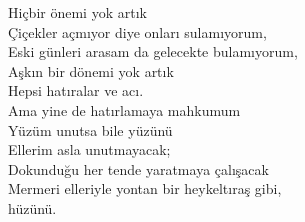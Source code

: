 \noindent\newline
Hiçbir önemi yok artık \\
Çiçekler açmıyor diye onları sulamıyorum, \\
Eski günleri arasam da gelecekte bulamıyorum, \\
Aşkın bir dönemi yok artık \\
Hepsi hatıralar ve acı. \\

\noindent\newline
Ama yine de hatırlamaya mahkumum \\
Yüzüm unutsa bile yüzünü \\
Ellerim asla unutmayacak; \\
Dokunduğu her tende yaratmaya çalışacak \\
Mermeri elleriyle yontan bir heykeltıraş gibi, \\
	hüzünü. \\